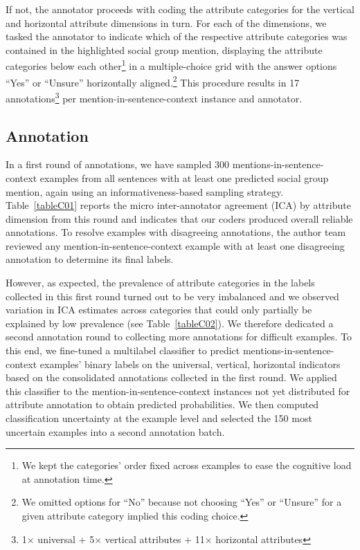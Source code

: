\documentclass[12pt]{article}
\begin{document}
If not, the annotator proceeds with coding the attribute categories for the vertical and horizontal attribute dimensions in turn.
For each of the dimensions, we tasked the annotator to indicate which of the respective attribute categories was contained in the highlighted social group mention, displaying the attribute categories below each other\footnote{We kept the categories' order fixed across examples to ease the cognitive load at annotation time.} in a multiple-choice grid with the answer options ``Yes'' or ``Unsure'' horizontally aligned.\footnote{We omitted options for ``No'' because not choosing ``Yes'' or ``Unsure'' for a given attribute category implied this coding choice.}
This procedure results in 17 annotations\footnote{1\(\times\) universal + 5\(\times\) vertical attributes + 11\(\times\) horizontal attributes} per mention-in-sentence-context instance and annotator.

\subsection{Annotation}\label{annotation-1}

In a first round of annotations, we have sampled 300 mentions-in-sentence-context examples from all sentences with at least one predicted social group mention, again using an informativeness-based sampling strategy.
Table~\ref{tableC01} reports the micro inter-annotator agreement (ICA) by attribute dimension from this round and indicates that our coders produced overall reliable annotations.
To resolve examples with disagreeing annotations, the author team reviewed any mention-in-sentence-context example with at least one disagreeing annotation to determine its final labels.

However, as expected, the prevalence of attribute categories in the labels collected in this first round turned out to be very imbalanced and we observed variation in ICA estimates across categories that could only partially be explained by low prevalence (see Table~\ref{tableC02}).
We therefore dedicated a second annotation round to collecting more annotations for difficult examples.
To this end, we fine-tuned a multilabel classifier to predict mentions-in-sentence-context examples' binary labels on the universal, vertical, horizontal indicators based on the consolidated annotations collected in the first round.
We applied this classifier to the mention-in-sentence-context instances not yet distributed for attribute annotation to obtain predicted probabilities.
We then computed classification uncertainty at the example level and selected the 150 most uncertain examples into a second annotation batch.
\end{document}
